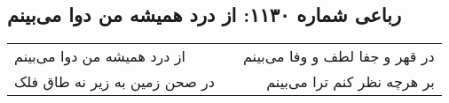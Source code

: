 \begin{center}
\section*{رباعی شماره ۱۱۳۰: از درد همیشه من دوا می‌بینم}
\label{sec:1130}
\begin{longtable}{l p{0.5cm} r}
از درد همیشه من دوا می‌بینم
&&
در قهر و جفا لطف و وفا می‌بینم
\\
در صحن زمین به زیر نه طاق فلک
&&
بر هرچه نظر کنم ترا می‌بینم
\\
\end{longtable}
\end{center}
